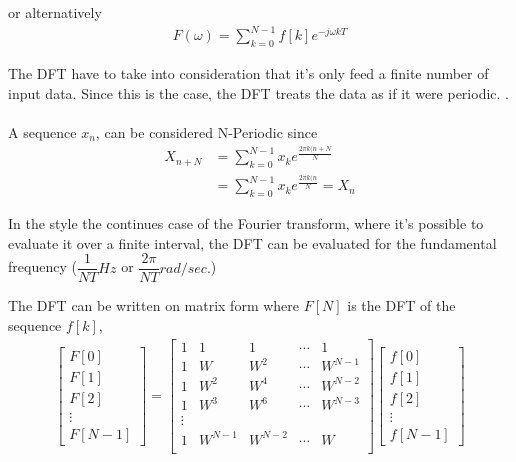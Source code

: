 or alternatively
\begin{align*}
	F(\omega) = \sum_{k=0}^{N-1}f[k]e^{-j\omega k T}
\end{align*} \cite{DFT_OX}


The DFT have to take into consideration that it's only feed a finite number of input data. Since this is the case, the DFT treats the data as if it were periodic. 
.
\\\\
A sequence $x_n$, can be considered N-Periodic since 
\begin{align*}
	X_{n+N} 
	&= \sum_{k=0}^{N-1}x_k e^{\frac{2 \pi k (n+N}{N}}\\
	&= \sum_{k=0}^{N-1}x_k e^{\frac{2 \pi k (n}{N}} = X_n
\end{align*} \cite{FSP}

In the style the continues case of the Fourier transform, where it's possible to evaluate it over a finite interval, the DFT can be evaluated for the fundamental frequency ($\dfrac{1}{NT} Hz$ or $\dfrac{2\pi}{NT}rad/sec.$) \cite{DFT_OX} 
%

The DFT can be written on matrix form where $F[N]$ is the DFT of the sequence $f[k]$,
\begin{align*}
	\begin{bmatrix}
		F[0]\\ F[1]\\ F[2]\\ \vdots \\ F[N-1]
	\end{bmatrix}
	=
	\begin{bmatrix}
		1 & 1 	& 1   	& \cdots & 1\\
		1 & W 	& W^2 	& \cdots & W^{N-1}\\
		1 & W^2	& W^4	& \cdots & W^{N-2}\\
		1 & W^3	& W^6	& \cdots & W^{N-3}\\
		\vdots\\
		1 & W^{N-1}	& W^{N-2}	& \cdots & W\\
	\end{bmatrix}
	\begin{bmatrix}
		f[0]\\ f[1]\\ f[2]\\ \vdots \\ f[N-1]
	\end{bmatrix}
\end{align*}

